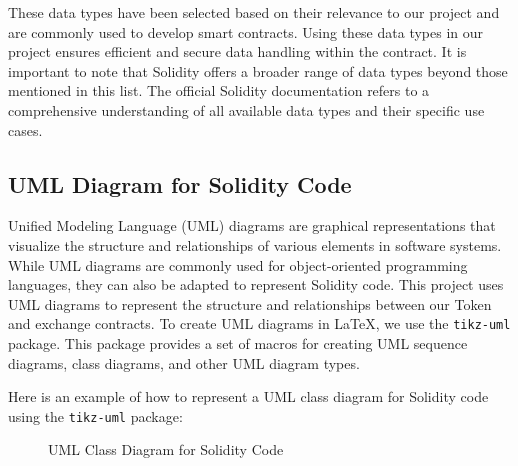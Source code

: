 These data types have been selected based on their relevance to our project and are commonly used to develop smart contracts. Using these data types in our project ensures efficient and secure data handling within the contract.
It is important to note that Solidity offers a broader range of data types beyond those mentioned in this list. The official Solidity documentation \cite{ethereum_solidity_doc} refers to a comprehensive understanding of all 
available data types and their specific use cases.


\subsection{UML Diagram for Solidity Code}

Unified Modeling Language (UML) diagrams are graphical representations that visualize the structure and relationships of various elements
in software systems. While UML diagrams are commonly used for object-oriented programming languages, they can also be adapted to represent
Solidity code. This project uses UML diagrams to represent the structure and relationships between our Token and exchange contracts.
To create UML diagrams in \LaTeX, we use the \texttt{tikz-uml} package. This package provides a set of macros for creating UML sequence diagrams, class diagrams, 
and other UML diagram types.


Here is an example of how to represent a UML class diagram for Solidity code using the \texttt{tikz-uml} package:


\begin{figure}[H]
   \centering
   \caption{UML Class Diagram for Solidity Code}
   \label{fig:uml_diagram}
\end{figure}

